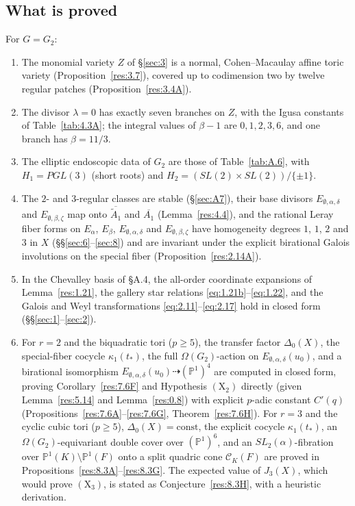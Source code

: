 \documentclass[12pt,letterpaper]{amsart}
\theoremstyle{plain}
\theoremstyle{definition}
\theoremstyle{remark}
\theoremstyle{definition}
\begin{document}
\subsection*{What is proved}
For $G=G_2$:
\begin{enumerate}[(1)]
\item The monomial variety $Z$ of \S\ref{sec:3} is a normal, Cohen--Macaulay
affine toric variety (Proposition~\ref{res:3.7}), covered up to codimension
two by twelve regular patches (Proposition~\ref{res:3.4A}).
\item The divisor $\lambda=0$ has exactly seven branches on $Z$, with the
Igusa constants of Table~\ref{tab:4.3A}; the integral values of $\beta-1$ are
$0,1,2,3,6$, and one branch has $\beta=11/3$.
\item The elliptic endoscopic data of $G_2$ are those of
Table~\ref{tab:A.6}, with $H_1=PGL(3)$ (short roots) and
$H_2=(SL(2)\times SL(2))/\{\pm1\}$.
\item The $2$- and $3$-regular classes are stable (\S\ref{sec:A7}), their
base divisors $E_{\emptyset,\alpha,\delta}$ and $E_{\emptyset,\beta,\zeta}$ map
onto $\overline{\tilde A_1}$ and $\overline{A_1}$ (Lemma~\ref{res:4.4}), and
the rational Leray fiber forms on $E_\alpha$, $E_\beta$,
$E_{\emptyset,\alpha,\delta}$ and $E_{\emptyset,\beta,\zeta}$ have homogeneity
degrees $1$, $1$, $2$ and $3$ in $X$ (\S\S\ref{sec:6}--\ref{sec:8}) and are
invariant under the explicit birational Galois involutions on the special fiber
(Proposition~\ref{res:2.14A}).
\item In the Chevalley basis of \S A.4, the all-order coordinate expansions of
Lemma~\ref{res:1.21}, the gallery star relations \eqref{eq:1.21b}--\eqref{eq:1.22},
and the Galois and Weyl transformations \eqref{eq:2.11}--\eqref{eq:2.17} hold in
closed form (\S\S\ref{sec:1}--\ref{sec:2}).
\item For $r=2$ and the biquadratic tori ($p\ge 5$), the transfer factor
$\Delta_0(X)$, the special-fiber cocycle $\kappa_1(t_*)$, the full
$\Omega(G_2)$-action on $E_{\emptyset,\alpha,\delta}(u_0)$, and a birational
isomorphism $E_{\emptyset,\alpha,\delta}(u_0)\dashrightarrow(\mathbb{P}^1)^4$ are
computed in closed form, proving Corollary~\ref{res:7.6F} and Hypothesis
$(\mathrm X_2)$ directly (given Lemma~\ref{res:5.14} and Lemma~\ref{res:0.8})
with explicit $p$-adic constant $C'(q)$ (Propositions~\ref{res:7.6A}--\ref{res:7.6G},
Theorem~\ref{res:7.6H}). For $r=3$ and the cyclic cubic tori ($p\ge 5$),
$\Delta_0(X)=\text{const}$, the explicit cocycle $\kappa_1(t_*)$, an
$\Omega(G_2)$-equivariant double cover over $(\mathbb{P}^1)^6$, and an
$SL_2(\alpha)$-fibration over $\mathbb{P}^1(K)\setminus\mathbb{P}^1(F)$ onto a
split quadric cone $\mathcal C_K(F)$ are proved in
Propositions~\ref{res:8.3A}--\ref{res:8.3G}. The expected value of $J_3(X)$,
which would prove $(\mathrm X_3)$, is stated as Conjecture~\ref{res:8.3H}, with a
heuristic derivation.
\end{enumerate}
\end{document}
